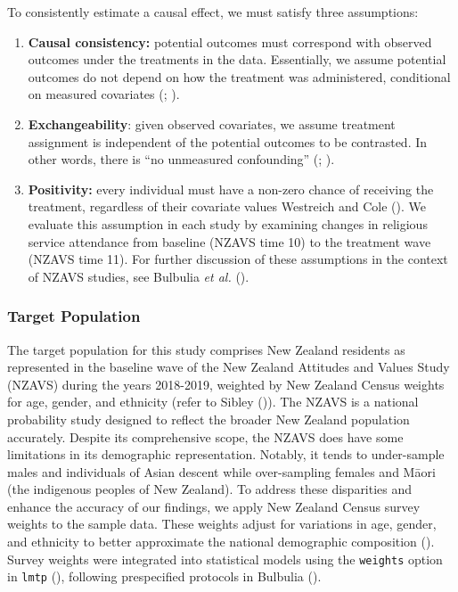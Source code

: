 \documentclass[
  single column]{article}
\begin{document}
To consistently estimate a causal effect, we must satisfy three
assumptions:

\begin{enumerate}
\def\labelenumi{\arabic{enumi}.}
\item
  \textbf{Causal consistency:} potential outcomes must correspond with
  observed outcomes under the treatments in the data. Essentially, we
  assume potential outcomes do not depend on how the treatment was
  administered, conditional on measured covariates
  (;
  ).
\item
  \textbf{Exchangeability}: given observed covariates, we assume
  treatment assignment is independent of the potential outcomes to be
  contrasted. In other words, there is ``no unmeasured confounding''
  (;
  ).
\item
  \textbf{Positivity:} every individual must have a non-zero chance of
  receiving the treatment, regardless of their covariate values
  Westreich and Cole (). We evaluate
  this assumption in each study by examining changes in religious
  service attendance from baseline (NZAVS time 10) to the treatment wave
  (NZAVS time 11). For further discussion of these assumptions in the
  context of NZAVS studies, see Bulbulia \emph{et al.}
  ().
\end{enumerate}

\subsubsection{Target Population}\label{target-population}

The target population for this study comprises New Zealand residents as
represented in the baseline wave of the New Zealand Attitudes and Values
Study (NZAVS) during the years 2018-2019, weighted by New Zealand Census
weights for age, gender, and ethnicity (refer to Sibley
()). The NZAVS is a national probability
study designed to reflect the broader New Zealand population accurately.
Despite its comprehensive scope, the NZAVS does have some limitations in
its demographic representation. Notably, it tends to under-sample males
and individuals of Asian descent while over-sampling females and Māori
(the indigenous peoples of New Zealand). To address these disparities
and enhance the accuracy of our findings, we apply New Zealand Census
survey weights to the sample data. These weights adjust for variations
in age, gender, and ethnicity to better approximate the national
demographic composition (). Survey
weights were integrated into statistical models using the
\texttt{weights} option in \texttt{lmtp}
(), following
prespecified protocols in Bulbulia
().
\end{document}

